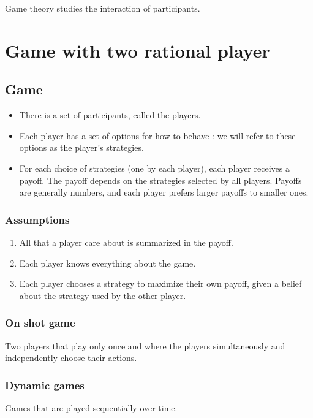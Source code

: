 Game theory studies the interaction of participants.

\section{Game with two rational player}

\subsection{Game}

\begin{itemize}
\item There is a set of participants, called the players.
\item Each player has a set of options for how to behave : we will refer to these options as the player's strategies.
\item For each choice of strategies (one by each player), each player receives a payoff. The payoff depends on the strategies selected by all players. Payoffs are generally numbers, and each player prefers larger payoffs to smaller ones.
\end{itemize}

\subsubsection{Assumptions}

\begin{enumerate}
\item All that a player care about is summarized in the payoff.
\item Each player knows everything about the game.
\item Each player chooses a strategy to maximize their own payoff, given a belief about the strategy used by the other player.
\end{enumerate}

\subsubsection{On shot game}

Two players that play only once and where the players simultaneously and independently choose their actions.

\subsubsection{Dynamic games}

Games that are played sequentially over time.

